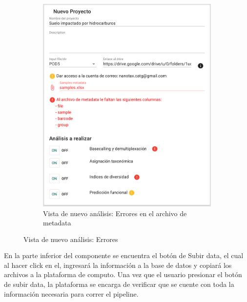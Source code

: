 \begin{figure}[H]
\begin{subfigure}[b]{0.45\textwidth}
        \includegraphics[width=\textwidth]{images/app/newAnalysis/metadata-error-1.png}
        \caption{Vista de nuevo análisis: Errores en el archivo de metadata}
        \label{fig:app-new-analysis-metadata-error}
    \end{subfigure}
    \caption{Vista de nuevo análisis: Errores }
    \label{fig:app-new-analysis-metadata-nodata-error}
\end{figure}



En la parte inferior del componente se encuentra el botón de Subir data, el cual al hacer click en el, ingresará la información a la base de datos y copiará los archivos a la plataforma de computo. Una vez que el usuario presionar el botón de subir data, la plataforma se encarga de verificar que se cuente con toda la información necesaria para correr el pipeline.






